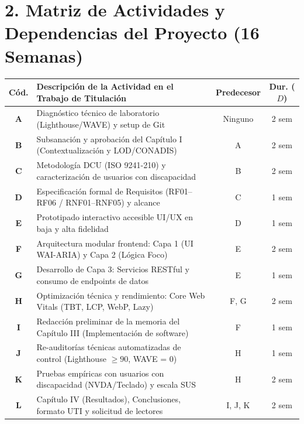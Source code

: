 \documentclass[11pt,a4paper]{article}
\begin{document}
\section*{\normalsize\color{utiNavy}2. Matriz de Actividades y Dependencias del Proyecto (16 Semanas)}

\begin{center}
\footnotesize
\renewcommand{\arraystretch}{1.1}
\begin{tabularx}{\textwidth}{c X c c}
\toprule
\textbf{Cód.} & \textbf{Descripción de la Actividad en el Trabajo de Titulación} & \textbf{Predecesor} & \textbf{Dur. ($D$)} \\
\midrule
\textbf{A} & Diagnóstico técnico de laboratorio (Lighthouse/WAVE) y setup de Git & Ninguno & 2 sem \\
\textbf{B} & Subsanación y aprobación del Capítulo I (Contextualización y LOD/CONADIS) & A & 2 sem \\
\textbf{C} & Metodología DCU (ISO 9241-210) y caracterización de usuarios con discapacidad & B & 2 sem \\
\textbf{D} & Especificación formal de Requisitos (RF01--RF06 / RNF01--RNF05) y alcance & C & 1 sem \\
\textbf{E} & Prototipado interactivo accesible UI/UX en baja y alta fidelidad & D & 1 sem \\
\textbf{F} & Arquitectura modular frontend: Capa 1 (UI WAI-ARIA) y Capa 2 (Lógica Foco) & E & 2 sem \\
\textbf{G} & Desarrollo de Capa 3: Servicios RESTful y consumo de endpoints de datos & E & 1 sem \\
\textbf{H} & Optimización técnica y rendimiento: Core Web Vitals (TBT, LCP, WebP, Lazy) & F, G & 2 sem \\
\textbf{I} & Redacción preliminar de la memoria del Capítulo III (Implementación de software) & F & 1 sem \\
\textbf{J} & Re-auditorías técnicas automatizadas de control (Lighthouse $\ge 90$, WAVE = 0) & H & 1 sem \\
\textbf{K} & Pruebas empíricas con usuarios con discapacidad (NVDA/Teclado) y escala SUS & H & 2 sem \\
\textbf{L} & Capítulo IV (Resultados), Conclusiones, formato UTI y solicitud de lectores & I, J, K & 2 sem \\
\bottomrule
\end{tabularx}
\end{center}
\end{document}
